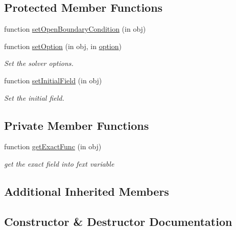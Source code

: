 \subsection*{Protected Member Functions}
\begin{DoxyCompactItemize}
\item 
function \hyperlink{class_oblique_jump2d_a0406461cfb327836d49647d99f3e9f52}{set\+Open\+Boundary\+Condition} (in obj)
\item 
function \hyperlink{class_oblique_jump2d_a01e30cf76737a9d5ee3ac0536394eca2}{set\+Option} (in obj, in \hyperlink{class_ndg_phys_af91f4c54b93504e76b38a5693774dff1}{option})
\begin{DoxyCompactList}\small\item\em Set the solver options. \end{DoxyCompactList}\item 
function \hyperlink{class_oblique_jump2d_ae3f2828701f1bed4540830694f3b0a3e}{set\+Initial\+Field} (in obj)
\begin{DoxyCompactList}\small\item\em Set the initial field. \end{DoxyCompactList}\end{DoxyCompactItemize}
\subsection*{Private Member Functions}
\begin{DoxyCompactItemize}
\item 
function \hyperlink{class_oblique_jump2d_a216d7ce85b33ed9b6d4149ebe1fae1b6}{get\+Exact\+Func} (in obj)
\begin{DoxyCompactList}\small\item\em get the exact field into fext variable \end{DoxyCompactList}\end{DoxyCompactItemize}
\subsection*{Additional Inherited Members}


\subsection{Constructor \& Destructor Documentation}
\mbox{\label{class_oblique_jump2d_af861efbdebdf7c5b00961b6addb750a9}} 
